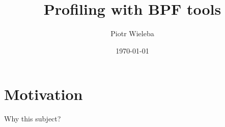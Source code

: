 \documentclass{beamer}
\title[BFP Tools]{Profiling with BPF tools} %
\author{Piotr Wieleba} %
\institute[DataArt] %
{
DataArt\\ %
\medskip
\textit{piotr.wieleba@dataart.com} %
}
\date{\today} %
\begin{document}
\begin{frame}
\titlepage %
\end{frame}



\section{Motivation}
\begin{frame}
    \centering
		\huge Why this subject?
\end{frame}
\end{document}
